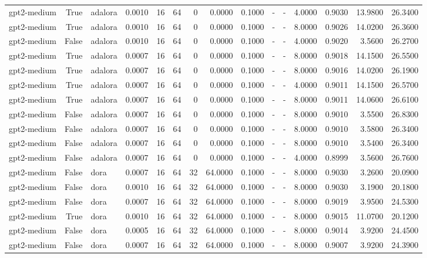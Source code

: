 \begin{tabular}{lrlrrrrrrlllrrr}
gpt2-medium & True & adalora & 0.0010 & 16 & 64 & 0 & 0.0000 & 0.1000 & - & - & 4.0000 & 0.9030 & 13.9800 & 26.3400 \\
gpt2-medium & True & adalora & 0.0010 & 16 & 64 & 0 & 0.0000 & 0.1000 & - & - & 8.0000 & 0.9026 & 14.0200 & 26.3600 \\
gpt2-medium & False & adalora & 0.0010 & 16 & 64 & 0 & 0.0000 & 0.1000 & - & - & 4.0000 & 0.9020 & 3.5600 & 26.2700 \\
gpt2-medium & True & adalora & 0.0007 & 16 & 64 & 0 & 0.0000 & 0.1000 & - & - & 8.0000 & 0.9018 & 14.1500 & 26.5500 \\
gpt2-medium & True & adalora & 0.0007 & 16 & 64 & 0 & 0.0000 & 0.1000 & - & - & 8.0000 & 0.9016 & 14.0200 & 26.1900 \\
gpt2-medium & True & adalora & 0.0007 & 16 & 64 & 0 & 0.0000 & 0.1000 & - & - & 4.0000 & 0.9011 & 14.1500 & 26.5700 \\
gpt2-medium & True & adalora & 0.0007 & 16 & 64 & 0 & 0.0000 & 0.1000 & - & - & 8.0000 & 0.9011 & 14.0600 & 26.6100 \\
gpt2-medium & False & adalora & 0.0007 & 16 & 64 & 0 & 0.0000 & 0.1000 & - & - & 8.0000 & 0.9010 & 3.5500 & 26.8300 \\
gpt2-medium & False & adalora & 0.0007 & 16 & 64 & 0 & 0.0000 & 0.1000 & - & - & 8.0000 & 0.9010 & 3.5800 & 26.3400 \\
gpt2-medium & False & adalora & 0.0007 & 16 & 64 & 0 & 0.0000 & 0.1000 & - & - & 8.0000 & 0.9010 & 3.5400 & 26.3400 \\
gpt2-medium & False & adalora & 0.0007 & 16 & 64 & 0 & 0.0000 & 0.1000 & - & - & 4.0000 & 0.8999 & 3.5600 & 26.7600 \\
gpt2-medium & False & dora & 0.0007 & 16 & 64 & 32 & 64.0000 & 0.1000 & - & - & 8.0000 & 0.9030 & 3.2600 & 20.0900 \\
gpt2-medium & False & dora & 0.0010 & 16 & 64 & 32 & 64.0000 & 0.1000 & - & - & 8.0000 & 0.9030 & 3.1900 & 20.1800 \\
gpt2-medium & False & dora & 0.0007 & 16 & 64 & 32 & 64.0000 & 0.1000 & - & - & 8.0000 & 0.9019 & 3.9500 & 24.5300 \\
gpt2-medium & True & dora & 0.0010 & 16 & 64 & 32 & 64.0000 & 0.1000 & - & - & 8.0000 & 0.9015 & 11.0700 & 20.1200 \\
gpt2-medium & False & dora & 0.0005 & 16 & 64 & 32 & 64.0000 & 0.1000 & - & - & 8.0000 & 0.9014 & 3.9200 & 24.4500 \\
gpt2-medium & False & dora & 0.0007 & 16 & 64 & 32 & 64.0000 & 0.1000 & - & - & 8.0000 & 0.9007 & 3.9200 & 24.3900 \\

\end{tabular}
